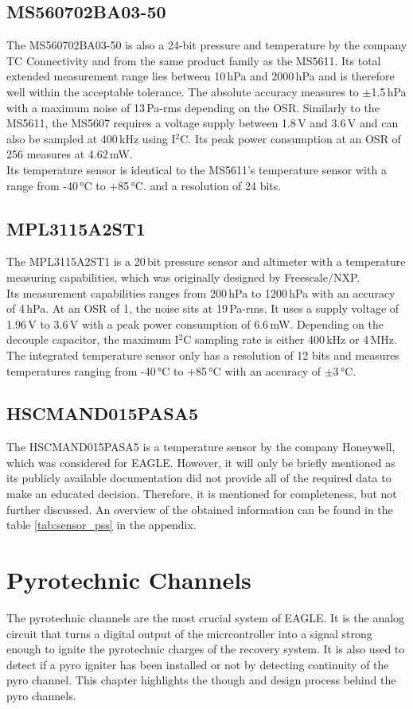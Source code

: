 \documentclass[fontsize=11pt,%
twoside,%
BCOR          = 8mm, %
DIV           = 11,  %
titlepage     = off,%
index=totoc,%
xcolor        = pdftex,%
dvipsnames,%
bibliography  = totoc,%
bibliography = numbered, %
listof        = notnumbered]{scrreprt}
\begin{document}
\subsection{MS560702BA03-50}
The MS560702BA03-50 is also a 24-bit pressure and temperature by the company TC Connectivity and from the same product family as the MS5611. Its total extended measurement range lies between 10\,hPa and 2000\,hPa and is therefore well within the acceptable tolerance. The absolute accuracy measures to $\pm$1.5\,hPa with a maximum noise of 13\,Pa-rms depending on the OSR. Similarly to the MS5611, the MS5607 requires a voltage supply between 1.8\,V and 3.6\,V and can also be sampled at 400\,kHz using I$^2$C. Its peak power consumption at an OSR of 256 measures at 4.62\,mW.\\
Its temperature sensor is identical to the MS5611's temperature sensor with a range from -40\,°C to +85\,°C. and a resolution of 24 bits.

\subsection{MPL3115A2ST1}
The MPL3115A2ST1 is a 20\,bit pressure sensor and altimeter with a temperature measuring capabilities, which was originally designed by Freescale/NXP.\\
Its measurement capabilities ranges from 200\,hPa to 1200\,hPa with an accuracy of 4\,hPa. At an OSR of 1, the noise sits at 19\,Pa-rms. It uses a supply voltage of 1.96\,V to 3.6\,V with a peak power consumption of 6.6\,mW. Depending on the decouple capacitor, the maximum I$^2$C sampling rate is either 400\,kHz or 4\,MHz.\\
The integrated temperature sensor only has a resolution of 12 bits and measures temperatures ranging from -40\,°C to +85\,°C with an accuracy of $\pm$3\,°C.

\subsection{HSCMAND015PASA5}
The HSCMAND015PASA5 is a temperature sensor by the company Honeywell, which was considered for EAGLE. However, it will only be briefly mentioned as its publicly available documentation did not provide all of the required data to make an educated decision. Therefore, it is mentioned for completeness, but not further discussed. An overview of the obtained information can be found in the table \ref{tab:sensor_pss} in the appendix.

\section{Pyrotechnic Channels}
The pyrotechnic channels are the most crucial system of EAGLE. It is the analog circuit that turns a digital output of the micrcontroller into a signal strong enough to ignite the pyrotechnic charges of the recovery system. It is also used to detect if a pyro igniter has been installed or not by detecting continuity of the pyro channel. This chapter highlights the though and design process behind the pyro channels.
\end{document}
